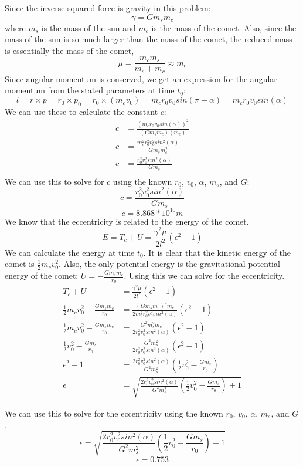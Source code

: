 \documentclass{article}
\begin{document}
Since the inverse-squared force is gravity in this problem:
$$ \gamma = G m_s m_c$$
where $m_s$ is the mass of the sun and $m_c$ is the mass of the comet. Also, since the mass of the sun is so much larger than the mass of the comet, the reduced mass is essentially the mass of the comet, 
$$\mu = \frac{m_cm_s}{m_s + m_c} \approx m_c$$
Since angular momentum is conserved, we get an expression for the angular momentum from the stated parameters at time $t_0$:
$$l=r\times p=r_0 \times p_0 = r_0 \times (m_cv_0)=m_cr_0v_0sin(\pi - \alpha) = m_cr_0v_0sin(\alpha)$$
We can use these to calculate the constant $c$:
\begin{align*}
    c &= \frac{(m_c r_0v_0sin(\alpha))^2}{(G m_s m_c)(m_c)} \\
    c &= \frac{m_c^2 r_0^2 v_0^2 sin^2(\alpha)}{G m_s m_c^2} \\
    c &= \frac{r_0^2 v_0^2 sin^2(\alpha)}{G m_s } \\
\end{align*}
We can use this to solve for $c$ using the known $r_0$, $v_0$, $\alpha$,  $m_s$, and $G$:
$$\boxed{c = \frac{r_0^2 v_0^2 sin^2(\alpha)}{G m_s } }$$
$$\boxed{c = 8.868*10^{10}m}$$
We know that the eccentricity is related to the energy of the comet. 
$$E = T_c + U = \frac{\gamma^2 \mu}{2l^2}(\epsilon^2 - 1) $$
We can calculate the energy at time $t_0$. It is clear that the kinetic energy of the comet is $\frac{1}{2}m_cv_0^2$. Also, the only potential energy is the gravitational potential energy of the comet: $U = -\frac{Gm_sm_c}{r_0}$. Using this we can solve for the eccentricity. 
\begin{align*}
    T_c + U &= \frac{\gamma^2 \mu}{2l^2}(\epsilon^2 - 1) \\
    \frac{1}{2}m_cv_0^2 - \frac{Gm_sm_c}{r_0}&= \frac{(Gm_sm_c)^2 m_c}{2m_c^2 r_0^2 v_0^2 sin^2(\alpha)}(\epsilon^2 - 1)\\
    \frac{1}{2}m_cv_0^2 - \frac{Gm_sm_c}{r_0}&= \frac{G^2m_s^2 m_c}{2r_0^2 v_0^2 sin^2(\alpha)}(\epsilon^2 - 1)\\
    \frac{1}{2}v_0^2 - \frac{Gm_s}{r_0}&= \frac{G^2m_s^2}{2r_0^2 v_0^2 sin^2(\alpha)}(\epsilon^2 - 1)\\
    \epsilon^2 - 1 &= \frac{2r_0^2 v_0^2 sin^2(\alpha)}{G^2m_s^2}\left( \frac{1}{2}v_0^2 - \frac{Gm_s}{r_0} \right) \\
    \epsilon &= \sqrt{\frac{2r_0^2 v_0^2 sin^2(\alpha)}{G^2m_s^2}\left( \frac{1}{2}v_0^2 - \frac{Gm_s}{r_0} \right) + 1}
\end{align*}

We can use this to solve for the eccentricity using the known $r_0$, $v_0$, $\alpha$,  $m_s$, and $G$. 
$$\boxed{\epsilon = \sqrt{\frac{2r_0^2 v_0^2 sin^2(\alpha)}{G^2m_s^2}\left( \frac{1}{2}v_0^2 - \frac{Gm_s}{r_0} \right) + 1}}$$
$$\boxed{\epsilon = 0.753}$$
\end{document}
